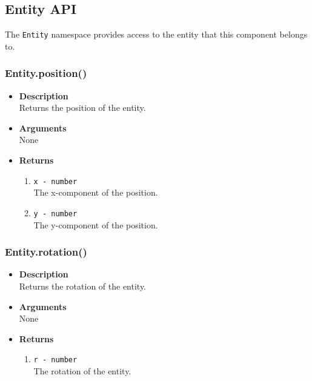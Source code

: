 \documentclass[12pt,a4paper]{article}
\begin{document}
\subsection{Entity API}

The \texttt{Entity} namespace provides access to the entity that this component belongs to. 

\subsubsection{Entity.position()}
\begin{itemize}
	\item[]{\bf Description}
		\\ Returns the position of the entity.
	\item[]{\bf Arguments}
		\\ None
	\item[]{\bf Returns}
		\begin{enumerate}
			\item{\texttt{x - number}} 
				\\ The x-component of the position.
			\item{\texttt{y - number}} 
				\\ The y-component of the position.
		\end{enumerate}
\end{itemize}

\subsubsection{Entity.rotation()}
\begin{itemize}
	\item[]{\bf Description}
		\\ Returns the rotation of the entity.
	\item[]{\bf Arguments}
		\\ None
	\item[]{\bf Returns}
		\begin{enumerate}
			\item{\texttt{r - number}} 
				\\ The rotation of the entity.
		\end{enumerate}
\end{itemize}
\end{document}
